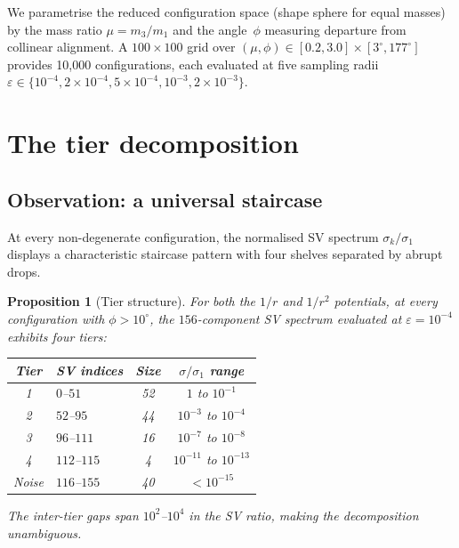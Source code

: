 \documentclass[11pt,a4paper]{article}
\newtheorem{proposition}[theorem]{Proposition}
\theoremstyle{remark}
\begin{document}
We parametrise the reduced configuration space (shape
sphere for equal masses) by the mass ratio
$\mu = m_3 / m_1$ and the angle~$\phi$ measuring
departure from collinear alignment.  A $100 \times 100$
grid over $(\mu, \phi) \in [0.2, 3.0] \times [3^\circ,
177^\circ]$ provides 10{,}000 configurations, each
evaluated at five sampling radii
$\varepsilon \in \{10^{-4}, 2\times 10^{-4},
5\times 10^{-4}, 10^{-3}, 2\times 10^{-3}\}$.


\section{The tier decomposition}
\label{sec:tiers}

\subsection{Observation: a universal staircase}

At every non-degenerate configuration, the normalised SV
spectrum $\sigma_k / \sigma_1$ displays a characteristic
staircase pattern with four shelves separated by abrupt
drops.

\begin{proposition}[Tier structure]
\label{prop:tiers}
For both the $1/r$ and $1/r^2$ potentials, at every
configuration with $\phi > 10^\circ$, the $156$-component
SV spectrum evaluated at $\varepsilon = 10^{-4}$ exhibits
four tiers:
\begin{center}
\begin{tabular}{@{}clcc@{}}
\toprule
Tier & SV indices & Size & $\sigma/\sigma_1$ range \\
\midrule
1 & $0$--$51$ & 52 & $1$ to $10^{-1}$ \\
2 & $52$--$95$ & 44 & $10^{-3}$ to $10^{-4}$ \\
3 & $96$--$111$ & 16 & $10^{-7}$ to $10^{-8}$ \\
4 & $112$--$115$ & 4 & $10^{-11}$ to $10^{-13}$ \\
\midrule
Noise & $116$--$155$ & 40 & $< 10^{-15}$ \\
\bottomrule
\end{tabular}
\end{center}
The inter-tier gaps span $10^{2}$--$10^{4}$ in the SV
ratio, making the decomposition unambiguous.
\end{proposition}
\end{document}
